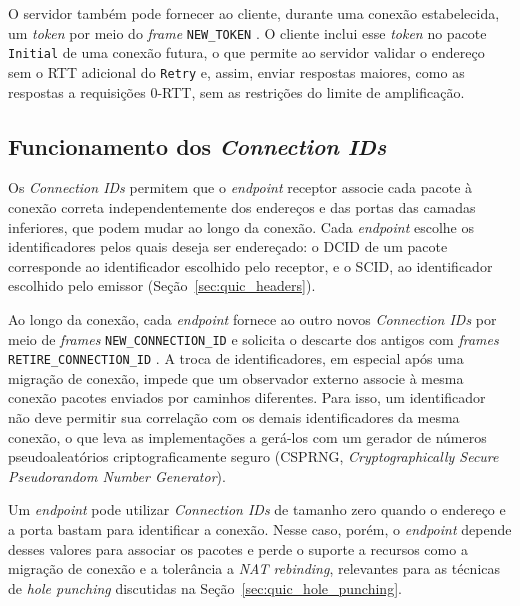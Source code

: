 O servidor também pode fornecer ao cliente, durante uma conexão estabelecida, um \textit{token} por meio do \textit{frame} \texttt{NEW\_\allowbreak{}TOKEN} \citep{rfc9000}. O cliente inclui esse \textit{token} no pacote \texttt{Initial} de uma conexão futura, o que permite ao servidor validar o endereço sem o RTT adicional do \texttt{Retry} e, assim, enviar respostas maiores, como as respostas a requisições 0-RTT, sem as restrições do limite de amplificação.

\subsection{Funcionamento dos \textit{Connection IDs}}
\label{sec:connection_ids_operation}

Os \textit{Connection IDs} permitem que o \textit{endpoint} receptor associe cada pacote à conexão correta independentemente dos endereços e das portas das camadas inferiores, que podem mudar ao longo da conexão. Cada \textit{endpoint} escolhe os identificadores pelos quais deseja ser endereçado: o DCID de um pacote corresponde ao identificador escolhido pelo receptor, e o SCID, ao identificador escolhido pelo emissor (Seção~\ref{sec:quic_headers}).

Ao longo da conexão, cada \textit{endpoint} fornece ao outro novos \textit{Connection IDs} por meio de \textit{frames} \texttt{NEW\_\allowbreak{}CONNECTION\_\allowbreak{}ID} e solicita o descarte dos antigos com \textit{frames} \texttt{RETIRE\_\allowbreak{}CONNECTION\_\allowbreak{}ID} \citep{rfc9000}. A troca de identificadores, em especial após uma migração de conexão, impede que um observador externo associe à mesma conexão pacotes enviados por caminhos diferentes. Para isso, um identificador não deve permitir sua correlação com os demais identificadores da mesma conexão, o que leva as implementações a gerá-los com um gerador de números pseudoaleatórios criptograficamente seguro (CSPRNG, \textit{Cryptographically Secure Pseudorandom Number Generator}).

Um \textit{endpoint} pode utilizar \textit{Connection IDs} de tamanho zero quando o endereço e a porta bastam para identificar a conexão. Nesse caso, porém, o \textit{endpoint} depende desses valores para associar os pacotes e perde o suporte a recursos como a migração de conexão e a tolerância a \textit{NAT rebinding}, relevantes para as técnicas de \textit{hole punching} discutidas na Seção~\ref{sec:quic_hole_punching}.


